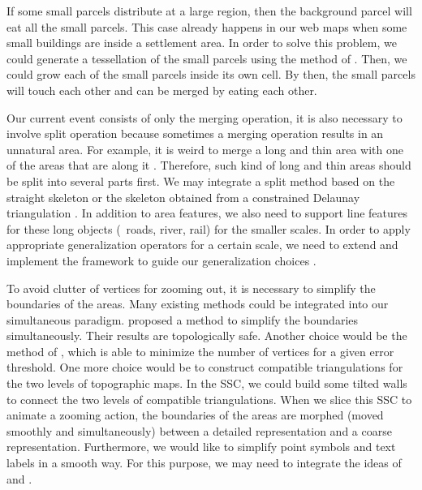 \documentclass[twocolumn]{svjour3}          %
\begin{document}
If some small parcels distribute at a large region,
then the background parcel will eat all the small parcels.
This case already happens in our web maps
when some small buildings are inside a settlement area.
In order to solve this problem, 
we could generate a tessellation of the small parcels
using the method of \citet{Ai2015Building}.
Then, we could grow each of the small parcels 
inside its own cell.
By then, the small parcels will touch each other
and can be merged by eating each other.

Our current event consists of only the merging operation,
it is also necessary to involve split operation
because sometimes a merging operation results in an unnatural area.
For example, it is weird to merge a long and thin area 
with one of the areas that are along it
\citep[see][]{Haunert2008Skeleton}.
Therefore, such kind of long and thin areas should be
split into several parts first.
We may integrate a split method based on the straight skeleton
\citep{Haunert2008Skeleton}
or the skeleton obtained from a constrained Delaunay triangulation
\citep{Ai2002GAP,Meijers2016Split}.
In addition to area features, we also need to support line features 
for these long objects (\eg~roads, river, rail) for the smaller scales.
In order to apply appropriate generalization operators
for a certain scale,
we need to extend and implement the framework 
to guide our generalization choices
\citep{Meijers2018Framework}.


To avoid clutter of vertices for zooming out, 
it is necessary to simplify the boundaries of the areas.
Many existing methods could be integrated into our simultaneous paradigm.
\citet{Meijers2011LineSimp} proposed a method 
to simplify the boundaries simultaneously. 
Their results are topologically safe. 
Another choice would be the method of \citet{ImaiIri1988},
which is able to minimize the number of vertices 
for a given error threshold.
One more choice would be to construct compatible triangulations 
\citep[see][]{Peng2019Thesis}
for the two levels of topographic maps.
In the SSC, we could build some tilted walls 
to connect the two levels of compatible triangulations.
When we slice this SSC to animate a zooming action,
the boundaries of the areas are morphed 
(moved smoothly and simultaneously)
between a detailed representation and a coarse representation.
Furthermore, we would like to 
simplify point symbols and text labels in a smooth way.
For this purpose, we may need to integrate the ideas of
\citet{Haunert2017Label} and \citet{sahw-oarps-ICAGW13}.
\end{document}
